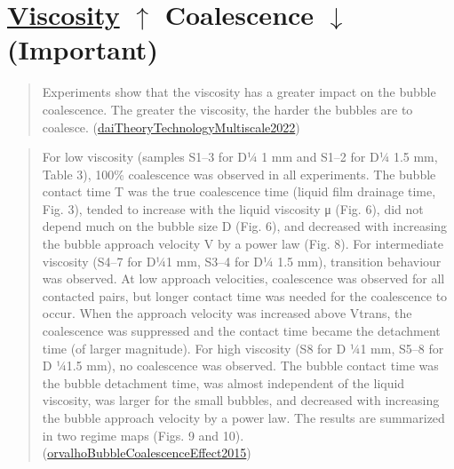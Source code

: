 \documentclass[11pt]{article}
\begin{document}
\section{\href{20240313140039-viscosity.org}{Viscosity} \(\uparrow\) Coalescence \(\downarrow\) (Important)}
\label{sec:org5e4fa09}
\begin{quote}
Experiments show that the viscosity has a greater impact on the bubble coalescence. The greater the viscosity, the harder the bubbles are to coalesce. (\href{20240318153036-theory_and_technology_of_multiscale_dispersed_particle_gel_for_in_depth_profile_control.org}{daiTheoryTechnologyMultiscale2022})
\end{quote}
\begin{quote}
For low viscosity (samples S1–3 for D¼ 1 mm and S1–2 for D¼ 1.5 mm, Table 3), 100\% coalescence was observed in all experiments. The bubble contact time T was the true coalescence time (liquid ﬁlm drainage time, Fig. 3), tended to increase with the liquid viscosity μ (Fig. 6), did not depend much on the bubble size D (Fig. 6), and decreased with increasing the bubble approach velocity V by a power law (Fig. 8). For intermediate viscosity (S4–7 for D¼1 mm, S3–4 for D¼ 1.5 mm), transition behaviour was observed. At low approach velocities, coalescence was observed for all contacted pairs, but longer contact time was needed for the coalescence to occur. When the approach velocity was increased above Vtrans, the coalescence was suppressed and the contact time became the detachment time (of larger magnitude). For high viscosity (S8 for D ¼1 mm, S5–8 for D ¼1.5 mm), no coalescence was observed. The bubble contact time was the bubble detachment time, was almost independent of the liquid viscosity, was larger for the small bubbles, and decreased with increasing the bubble approach velocity by a power law. The results are summarized in two regime maps (Figs. 9 and 10). (\href{20240318155943-bubble_coalescence_effect_of_bubble_approach_velocity_and_liquid_viscosity.org}{orvalhoBubbleCoalescenceEffect2015})
\end{quote}
\end{document}
